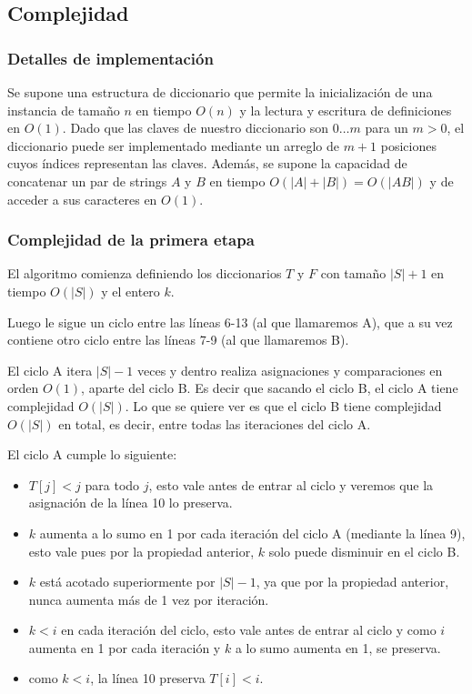\subsection{Complejidad}

\subsubsection{Detalles de implementación}

Se supone una estructura de diccionario que permite la inicialización de una instancia de tamaño $n$ en tiempo $O(n)$ y la lectura y escritura de definiciones en $O(1)$. Dado que las claves de nuestro diccionario son $0 \dots m$ para un $m > 0$, el diccionario puede ser implementado mediante un arreglo de $m+1$ posiciones cuyos índices representan las claves. Además, se supone la capacidad de concatenar un par de strings $A$ y $B$ en tiempo $O(|A|+|B|) = O(|AB|)$ y de acceder a sus caracteres en $O(1)$.

\subsubsection{Complejidad de la primera etapa}

El algoritmo comienza definiendo los diccionarios $T$ y $F$ con tamaño $|S|+1$ en tiempo $O(|S|)$ y el entero $k$.

Luego le sigue un ciclo entre las líneas 6-13 (al que llamaremos A), que a su vez contiene otro ciclo
entre las líneas 7-9 (al que llamaremos B).

El ciclo A itera $|S|-1$ veces y dentro realiza asignaciones y comparaciones en orden $O(1)$, aparte del ciclo B. Es decir que
sacando el ciclo B, el ciclo A tiene complejidad $O(|S|)$. Lo que se quiere ver es que el ciclo B tiene
complejidad $O(|S|)$ en total, es decir, entre todas las iteraciones del ciclo A.

El ciclo A cumple lo siguiente:
\begin{itemize}
	\item $T[j] < j$ para todo $j$, esto vale antes de entrar al ciclo
	y veremos que la asignación de la línea 10 lo preserva.
	\item $k$ aumenta a lo sumo en 1 por cada iteración del ciclo A (mediante la línea 9), esto vale pues por la
	propiedad anterior, $k$ solo puede disminuir en el ciclo B.
	\item $k$ está acotado superiormente por $|S|-1$, ya que por la propiedad anterior, nunca
	aumenta más de 1 vez por iteración.
	\item $k < i$ en cada iteración del ciclo, esto vale antes de entrar al ciclo
	y como $i$ aumenta en 1 por cada iteración y $k$ a lo sumo aumenta en 1, se preserva.
	\item como $k < i$, la línea 10 preserva $T[i] < i$.
\end{itemize}

